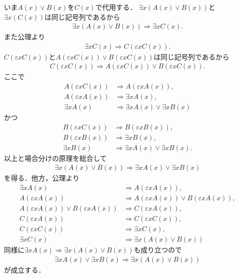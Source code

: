 \begin{prf}
		いま$A(x) \vee B(x)$を$C(x)$で代用する．
		$\exists x ( A(x) \vee B(x) )$と$\exists x ( C(x) )$は同じ記号列であるから
		\begin{align}
			\exists x ( A(x) \vee B(x) ) \Longrightarrow \exists x C(x).
		\end{align}
		また公理より
		\begin{align}
			\exists x C(x) \Longrightarrow C(\varepsilon x C(x)).
		\end{align}
		$C(\varepsilon x C(x))$と$A(\varepsilon x C(x)) \vee B(\varepsilon x C(x))$は同じ記号列であるから
		\begin{align}
			C(\varepsilon x C(x)) \Longrightarrow A(\varepsilon x C(x)) \vee B(\varepsilon x C(x)).
		\end{align}
		ここで
		\begin{align}
			A(\varepsilon x C(x)) &\Longrightarrow A(\varepsilon x A(x)), \\
			A(\varepsilon x A(x)) &\Longrightarrow \exists x A(x), \\
			\exists x A(x) &\Longrightarrow \exists x A(x) \vee \exists x B(x)
		\end{align}
		かつ
		\begin{align}
			B(\varepsilon x C(x)) &\Longrightarrow B(\varepsilon x B(x)), \\
			B(\varepsilon x B(x)) &\Longrightarrow \exists x B(x), \\
			\exists x B(x) &\Longrightarrow \exists x A(x) \vee \exists x B(x).
		\end{align}
		以上と場合分けの原理を総合して
		\begin{align}
			\exists x ( A(x) \vee B(x) ) \Longrightarrow \exists x A(x) \vee \exists x B(x)
		\end{align}
		を得る．他方，公理より
		\begin{align}
			\exists x A(x) &\Longrightarrow A(\varepsilon x A(x)), \\
			A(\varepsilon x A(x)) &\Longrightarrow A(\varepsilon x A(x)) \vee B(\varepsilon x A(x)), \\
			A(\varepsilon x A(x)) \vee B(\varepsilon x A(x)) &\Longrightarrow C(\varepsilon x A(x)), \\
			C(\varepsilon x A(x)) &\Longrightarrow C(\varepsilon x C(x)), \\
			C(\varepsilon x C(x)) &\Longrightarrow \exists x C(x), \\
			\exists x C(x) &\Longrightarrow \exists x (A(x) \vee B(x))
		\end{align}
		同様に$\exists x A(x) \Longrightarrow \exists x (A(x) \vee B(x))$も成り立つので
		\begin{align}
			\exists x A(x) \vee \exists x B(x) \Longrightarrow \exists x (A(x) \vee B(x))
		\end{align}
		が成立する．
		\QED
	\end{prf}